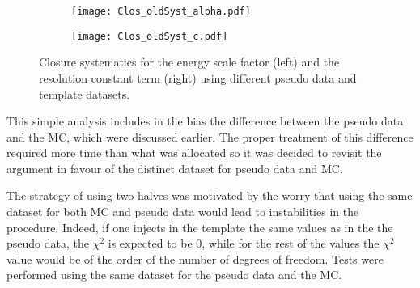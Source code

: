 \begin{enumerate}
\begin{figure}
\begin{subfigure}[t]{0.49\linewidth}
\begin{center}
\texttt{[image: Clos\_oldSyst\_alpha.pdf]}
\end{center}
\end{subfigure}
\begin{subfigure}[t]{0.49\linewidth}
\begin{center}
\texttt{[image: Clos\_oldSyst\_c.pdf]}
\end{center}
\end{subfigure}
\caption{\label{org3b08331}
Closure systematics for the energy scale factor (left) and the resolution constant  term (right) using different pseudo data and template datasets. \cite{Guerguichon_170420}}
\end{figure}


This simple analysis includes in the bias the difference between the pseudo data and the MC, which were discussed earlier.
The proper treatment of this difference required more time than what was allocated so it was decided to revisit the argument in favour of the distinct dataset for pseudo data and MC.

The strategy of using two halves was motivated by the worry that using the same dataset for both MC and pseudo data would lead to instabilities in the procedure.
Indeed, if one injects in the template the same values as in the the pseudo data, the $\chi^2$ is expected to be 0, while for the rest of the values the $\chi^2$ value would be of the order of the number of degrees of freedom.
Tests were performed using the same dataset for the pseudo data and the MC.


\end{enumerate}
